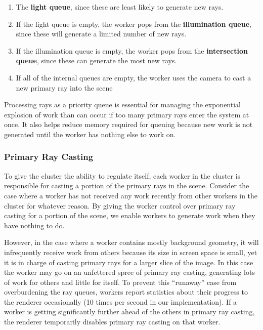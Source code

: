\documentclass[a4paper,twoside]{article}
\begin{document}
\begin{enumerate}
   \item The \textbf{light queue}, since these are least likely to generate
      new rays.
   \item If the light queue is empty, the worker pops from the \textbf{illumination queue},
      since these will generate a limited number of new rays.
   \item If the illumination queue is empty, the worker pops from the
      \textbf{intersection queue}, since these can generate the most new rays.
   \item If all of the internal queues are empty, the worker uses the camera to cast a
      new primary ray into the scene %
\end{enumerate}

Processing rays as a priority queue is essential for managing the exponential
explosion of work than can occur if too many primary rays enter the system at
once. It also helps reduce memory required for queuing because new work is not
generated until the worker has nothing else to work on.

\subsubsection{Primary Ray Casting}
\label{primaryrays}

To give the cluster the ability
to regulate itself, each worker in the cluster is responsible for casting a portion of the primary
rays in the scene. Consider the case where a worker has not received any work recently from other
workers in the cluster for whatever reason.
By giving the worker control over primary ray
casting for a portion of the scene, we enable workers to generate work when
they have nothing to do.

However, in the case where a worker contains mostly background
geometry, it will infrequently receive work from others because its size
in screen space is small, yet it is in charge of casting primary rays for
a larger slice of the image. In this case the worker may go on an
unfettered spree of primary ray casting, generating lots of work for others and
little for itself. To prevent this ``runaway'' case from overburdening the ray queues, workers
report statistics about their progress to the renderer occasionally (10 times
per second in our implementation). If a worker is
getting significantly further ahead of the others in primary ray casting, the renderer
temporarily disables primary ray casting on that worker.
\end{document}
